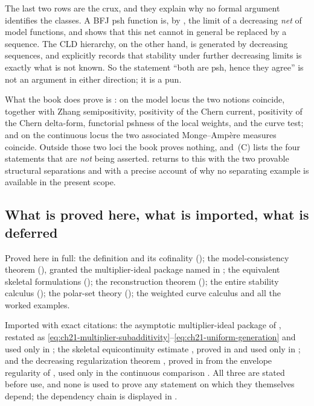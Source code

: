 The last two rows are the crux, and they explain why no formal argument
identifies the classes.  A BFJ psh function is, by
, the limit of a decreasing
\emph{net} of model functions, and  shows
that this net cannot in general be replaced by a sequence.  The CLD
hierarchy, on the other hand, is generated by decreasing sequences, and
 explicitly records that stability
under further decreasing limits is exactly what is not known.  So the
statement ``both are psh, hence they agree'' is not an argument in either
direction; it is a pun.

What the book does prove is
: on the model locus the two notions
coincide, together with Zhang semipositivity, positivity of the Chern
current, positivity of the Chern delta-form, functorial pshness of the local
weights, and the curve test; and on the continuous locus the two associated
Monge--Amp\`ere measures coincide.  Outside those two loci the book proves
nothing, and \,(C) lists the four
statements that are \emph{not} being asserted.  
returns to this with the two provable structural separations and with a
precise account of why no separating example is available in the present
scope.

\subsection{What is proved here, what is imported, what is deferred}
\label{sec:ch21-imported}

Proved here in full: the definition and its cofinality
(); the model-consistency theorem
(), granted the multiplier-ideal package
named in ; the equivalent skeletal
formulations (); the reconstruction theorem
(); the entire stability calculus
(); the polar-set theory
(); the weighted curve calculus and all the
worked examples.

Imported with exact citations: the asymptotic multiplier-ideal package of
\cite[Appendix~B]{BFJ16}, restated as
\eqref{eq:ch21-multiplier-subadditivity}--\eqref{eq:ch21-uniform-generation}
and used only in ; the skeletal
equicontinuity estimate , proved in
 and used only in
; and the decreasing regularization
theorem , proved in
 from the envelope regularity of
, used only in the continuous comparison
.  All three are stated before use, and none
is used to prove any statement on which they themselves depend; the
dependency chain is displayed in .

